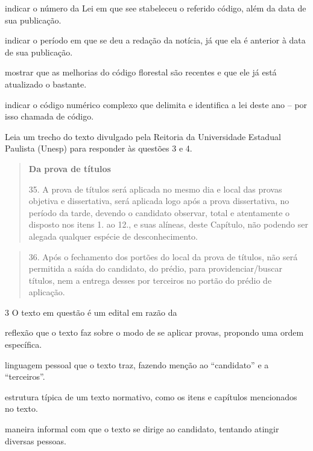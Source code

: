 \begin{escolha}
\item indicar o número da Lei em que see stabeleceu o referido código,
além da data de sua publicação.

\item indicar o período em que se deu a redação da notícia, já que ela é
anterior à data de sua publicação.

\item mostrar que as melhorias do código florestal são recentes e que ele
já está atualizado o bastante.

\item indicar o código numérico complexo que delimita e identifica a lei
deste ano -- por isso chamada de código.
\end{escolha}


Leia um trecho do texto divulgado pela Reitoria da Universidade Estadual
Paulista (Unesp) para responder às questões 3 e 4.

\begin{quote}
\textbf{Da prova de títulos}


35. A prova de títulos será aplicada no mesmo dia e local das provas
objetiva e dissertativa, será aplicada logo após a prova dissertativa,
no período da tarde, devendo o candidato observar, total e atentamente o
disposto nos itens 1. ao 12., e suas alíneas, deste Capítulo, não
podendo ser alegada qualquer espécie de desconhecimento.
\end{quote}

\pagebreak
\begin{quote}
36. Após o fechamento dos portões do local da prova de títulos, não será
permitida a saída do candidato, do prédio, para providenciar/buscar
títulos, nem a entrega desses por terceiros no portão do prédio de
aplicação.

\end{quote}

\num{3} O texto em questão é um edital em razão da

\begin{escolha}
\item reflexão que o texto faz sobre o modo de se aplicar provas, propondo
uma ordem específica.

\item linguagem pessoal que o texto traz, fazendo menção ao ``candidato''
e a ``terceiros''.

\item estrutura típica de um texto normativo, como os itens e capítulos
mencionados no texto.

\item maneira informal com que o texto se dirige ao candidato, tentando
atingir diversas pessoas.
\end{escolha}

